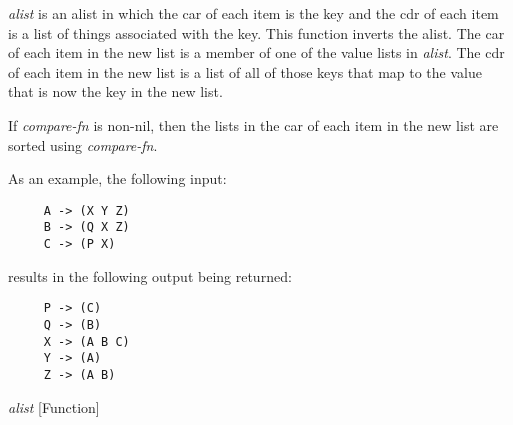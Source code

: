 \begin{doc-string}
\emph{alist} is an alist in which the car of each item is the key and the cdr of
each item is a list of things associated with the key.  This function inverts
the alist.  The car of each item in the new list is a member of one of the value
lists in \emph{alist}.  The cdr of each item in the new list is a list of all of those
keys that map to the value that is now the key in the new list.

If \emph{compare-fn} is non-nil, then the lists in the car of each item in the new list
are sorted using \emph{compare-fn}.

As an example, the following input:

\small{\begin{verbatim}
     A -> (X Y Z)
     B -> (Q X Z)
     C -> (P X)
\end{verbatim}}

results in the following output being returned:

\small{\begin{verbatim}
     P -> (C)
     Q -> (B)
     X -> (A B C)
     Y -> (A)
     Z -> (A B)
\end{verbatim}}
\end{doc-string}

\vspace{1em}
\noindent
{}
\usebox{\funcname}\emph{alist}
 \hfill [Function]

